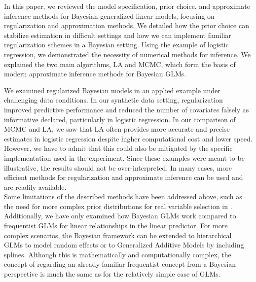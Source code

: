 In this paper, we reviewed the model specification, prior choice, and approximate inference methods for Bayesian generalized linear models, focusing on regularization and approximation methods.
We detailed how the prior choice can stabilize estimation in difficult settings and how we can implement familiar regularization schemes in a Bayesian setting.
Using the example of logistic regression, we demonstrated the necessity of numerical methods for inference.
We explained the two main algorithms, LA and MCMC, which form the basis of modern approximate inference methods for Bayesian GLMs.

We examined regularized Bayesian models in an applied example under challenging data conditions.
In our synthetic data setting, regularization improved predictive performance and reduced the number of covariates falsely as informative declared, particularly in logistic regression.
In our comparison of MCMC and LA, we saw that LA often provides more accurate and precise estimates in logistic regression despite higher computational cost and lower speed.
However, we have to admit that this could also be mitigated by the specific implementation used in the experiment.
Since these examples were meant to be illustrative, the results should not be over-interpreted.
In many cases, more efficient methods for regularization and approximate inference can be used and are readily available.\\

Some limitations of the described methods have been addressed above, such as the need for more complex prior distributions for real variable selection in .
Additionally, we have only examined how Bayesian GLMs work compared to frequentist GLMs for linear relationships in the linear predictor.
For more complex scenarios, the Bayesian framework can be extended to hierarchical GLMs to model random effects or to Generalized Additive Models by including splines.
Although this is mathematically and computationally complex, the concept of regarding an already familiar frequentist concept from a Bayesian perspective is much the same as for the relatively simple case of GLMs.
